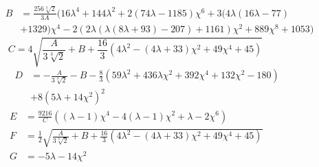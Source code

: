 \begin{equation}
    \begin{split}
   B &= \frac{256 \sqrt[3]{2}}{3A} \bigg(16 \lambda ^4+144 \lambda ^2+2 (74 \lambda -1185) \chi ^6+3 (4 \lambda  (16 \lambda -77)\\
   &+1329) \chi ^4-2 (2 \lambda  (\lambda  (8 \lambda +93)-207)+1161) \chi ^2+889 \chi ^8+1053\bigg)
    \end{split}
\end{equation}
\begin{equation}
   C =4 \sqrt{\frac{A}{3 \sqrt[3]{2}}+B+\frac{16}{3} \left(4 \lambda ^2-(4 \lambda +33) \chi ^2+49 \chi ^4+45\right)}\qquad\qquad\quad
\end{equation}
\begin{equation}
    \begin{split}
   D &= -\frac{A}{3 \sqrt[3]{2}}-B-\frac{8}{3} \left(59 \lambda ^2+436 \lambda  \chi ^2+392 \chi ^4+132 \chi ^2-180\right)\qquad\;\;\\
   &+8 \left(5 \lambda +14 \chi ^2\right)^2
    \end{split}
\end{equation}
\begin{equation}
    \begin{split}       
    E &= \frac{9216}{C} \left((\lambda -1) \chi ^4-4 (\lambda -1) \chi ^2+\lambda -2 \chi ^6\right)\\
    F &= \frac{1}{2} \sqrt{\frac{A}{3 \sqrt[3]{2}}+B+\frac{16}{3} \left(4 \lambda ^2-(4 \lambda +33) \chi ^2+49 \chi ^4+45\right)}\qquad\qquad\;\;\;\\
    G &= -5 \lambda -14 \chi ^2
    \end{split}
\end{equation}